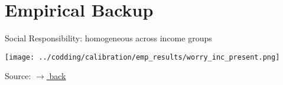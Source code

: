 \documentclass[11pt,aspectratio=169]{beamer}
\newcommand{\tr}[1]{\textcolor{blue}{#1}}
\newcommand{\ar}{$\Rightarrow$ \ }
\begin{document}
		\section{Empirical Backup}
	
	\begin{frame}{Social Responsibility: homogeneous across income groups}
		\hypertarget{atts}{}
		\vspace{0mm}
		\vspace{2mm}
		\centering
		\begin{minipage}[]{0.6\textwidth}
			\texttt{[image: ../codding/calibration/emp\_results/worry\_inc\_present.png]}
		\end{minipage}
		
		\tiny{Source: \cite{CCAM}}
		\vspace{-9mm}
		\hfill	\hyperlink{backAtt}{\tiny{$\rightarrow$ back}}
	\end{frame}
	
	
\end{document}
